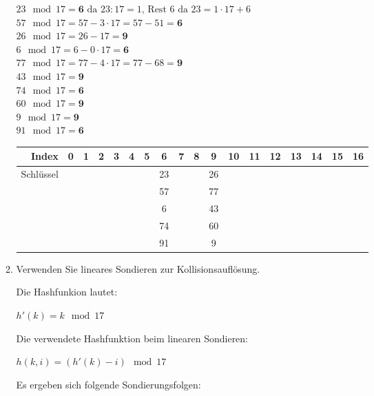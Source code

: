 \documentclass{lehramt-informatik-aufgabe}
\begin{document}
\begin{enumerate}
\begin{enumerate}
\begin{antwort}
$23 \mod 17 = \textbf{6} \text{ da } 23 : 17 = 1 \text{, Rest } 6 \text{ da } 23 = 1 \cdot 17 + 6$\\
$57 \mod 17 = 57 - 3 \cdot 17 = 57 - 51 = \textbf{6}$\\
$26 \mod 17 = 26 - 17 = \textbf{9}$\\
$6 \mod 17 = 6 - 0 \cdot 17 = \textbf{6}$\\
$77 \mod 17 = 77 - 4 \cdot 17 = 77 - 68 = \textbf{9}$\\
$43 \mod 17 = \textbf{9}$\\
$74 \mod 17 = \textbf{6}$\\
$60 \mod 17 = \textbf{9}$\\
$9 \mod 17 = \textbf{9}$\\
$91 \mod 17 = \textbf{6}$\\

{
\setlength{\tabcolsep}{2pt}
\footnotesize
\begin{tabular}{r|ccccccccccccccccc}
Index & 0 & 1 & 2 & 3 & 4 & 5 & 6 & 7 & 8 & 9 & 10 & 11 & 12 & 13 & 14 & 15 & 16 \\\hline
Schlüssel &&&&&&&23&&&26&&&&&&&\\
          &&&&&&&57&&&77&&&&&&&\\
          &&&&&&&6 &&&43&&&&&&&\\
          &&&&&&&74&&&60&&&&&&&\\
          &&&&&&&91&&&9 &&&&&&&\\
\end{tabular}
}
\end{antwort}


\item Verwenden Sie lineares Sondieren zur Kollisionsauflösung.

\def\tmp#1{{\tiny($#1$)}}

\begin{antwort}
\def\tmp#1{{\footnotesize#1}}

Die Hashfunkion lautet:

\tmp{$h'(k) = k \mod 17$}

Die verwendete Hashfunktion beim linearen Sondieren:

\tmp{$h(k, i) = (h'(k) - i) \mod 17$}

\bigskip

Es ergeben sich folgende Sondierungsfolgen:
{
\setlength{\tabcolsep}{2pt}
\footnotesize

}
\end{antwort}
\end{enumerate}
\end{enumerate}
\end{document}
